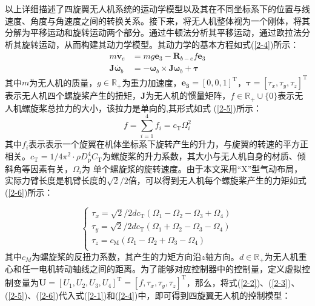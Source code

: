 \documentclass[lang=chs, degree=master, blindreview=false, winfonts=true]{yanputhesis}
\begin{document}
以上详细描述了四旋翼无人机系统的运动学模型以及其在不同坐标系下的位置与线速度、角度与角速度之间的转换关系。接下来，将无人机整体视为一个刚体，将其分解为平移运动和旋转运动两个部分。通过牛顿法分析其平移运动，通过欧拉法分析其旋转运动，从而构建其动力学模型。其动力学的基本方程如式(\ref{2-4})所示：
\begin{equation}
	\begin{aligned}
		m\dot{\boldsymbol{v}}_e&=mg\bm{e}_{3}-\boldsymbol{R}_{b-e}f\bm{e}_{3}\\
		\boldsymbol{J}\dot{\boldsymbol{\omega}_b}&=-\bm \omega_b \times \bm J \bm \omega_b+\boldsymbol{\tau}
	\end{aligned}\label{2-4}
\end{equation}
其中$m$为无人机的质量，$g\in\mathbb{R}_+$为重力加速度，$\bm{e_{3}}=\left[0,0,1\right]^\mathrm{T}$，$\boldsymbol{\tau}=\left[\tau_x,\tau_y,\tau_z\right]^\mathrm{T}$表示无人机四个螺旋桨产生的扭矩，$\boldsymbol{J}$为无人机的惯量矩阵，$f\in\mathbb{R}_+\cup\{0\}$表示无人机螺旋桨总拉力的大小，该拉力是单向的,其形式如式 (\ref{2-5})所示：
\begin{equation}
	f=\sum_{i=1}^4f_i=c_\mathrm{T}\Omega_i^2
	\label{2-5}
\end{equation}
其中$f_i$表示表示一个旋翼在机体坐标系下旋转产生的升力，与旋翼的转速的平方正相关。$c_\mathrm{T}=1/4\pi^2\cdot\rho D_\mathrm{p}^4C_\mathrm{T}$为螺旋桨的升力系数，其大小与无人机自身的材质、倾斜角等因素有关，$\Omega_i$为
单个螺旋浆的旋转速度。由于本文采用“X”型气动布局，实际力臂长度是机臂长度的$\sqrt{2}/2$倍，可以得到无人机每个螺旋桨产生的力矩如式(\ref{2-6})所示：


\begin{equation}
	\left\{ \begin{array}{l}
		\tau_x={\sqrt{2}}/{2}dc_\mathrm{T}\left(\Omega_1-\Omega_2-\Omega_3+\Omega_4\right)\\
		\tau_y={\sqrt{2}}/{2}dc_\mathrm{T}\left(\Omega_1+\Omega_2-\Omega_3-\Omega_4\right)\\
		\tau_z=c_\mathrm{M}\left(\Omega_1-\Omega_2+\Omega_3-\Omega_4\right)\\
	\end{array} \right.
		\label{2-6}
\end{equation}
其中$c_M$为螺旋桨的反扭力系数，其产生的力矩方向沿$z$轴方向。$d\in\mathbb{R}_+$为无人机重心和任一电机转动轴线之间的距离。为了能够对应控制器中的控制量，定义虚拟控制变量为$\bm{U}=\left[U_1,U_2,U_3,U_4\right]^\mathrm{T}=\left[f,\tau_x,\tau_y,\tau_z\right]^\mathrm{T}$，那么，将式(\ref{2-2})、(\ref{2-3})、(\ref{2-5})、(\ref{2-6})代入式(\ref{2-1})和(\ref{2-4})中，即可得到四旋翼无人机的控制模型：
\end{document}
